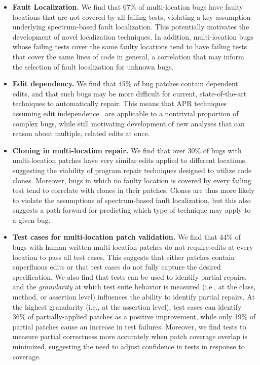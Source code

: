 \documentclass[10pt, conference]{IEEEtran}
\newcommand\bears{\textsc{Bears}\xspace}
\begin{document}
\begin{itemize}
\item \textbf{Fault Localization.}  We find that 67\% of multi-location bugs have faulty 
locations that are not
  covered by all failing tests, violating a key assumption underlying
  spectrum-based fault localization. This potentially 
  motivates the development of novel localization techniques. 
  In addition, multi-location bugs whose failing tests cover the same faulty locations tend to 
  have failing tests that cover the same lines of code in general, a correlation
  that may inform the selection of fault localization for unknown bugs. 
\item \textbf{Edit dependency.} We 
find that 45\% of bug patches contain dependent edits, and that such bugs
may be more difficult for current, state-of-the-art
techniques to automatically repair.  This means that APR techniques assuming edit
independence~\cite{saha2019harnessing, theotherone} are applicable to a nontrivial proportion of complex bugs, while
still motivating development of new analyses that can reason about multiple,
related edits at once. 
\item \textbf{Cloning in multi-location repair.} We find that over 30\% of bugs with multi-location
patches have very similar edits applied to different locations, suggesting the viability of 
program repair techniques designed to utilize code clones. Moreover, bugs in which 
no faulty location is covered by every failing test tend to correlate with
clones in their patches.  
Clones are thus more likely to violate the assumptions of spectrum-based fault 
localization, but this also suggests a path forward for predicting 
which type of technique may apply to a given bug. 
\item \textbf{Test cases for multi-location patch validation.}
  We find that 44\% of bugs with human-written multi-location patches do not
  require edits at every location to pass all test cases. This suggests that
  either patches contain superfluous edits or that test cases do not fully
  capture the desired specification. We also find that tests can be used to
  identify partial repairs, and the \emph{granularity} at which test suite
  behavior is measured (i.e., at the class, method, or assertion level)
  influences the ability to identify partial repairs. At the highest granularity
  (i.e., at the assertion level), test cases can identify 36\% of
  partially-applied patches as a positive improvement, while only 19\% of
  partial patches cause an increase in test failures. Moreover, we find 
  tests to measure partial correctness more accurately when patch coverage 
  overlap is minimized, suggesting the need to adjust confidence in tests
  in response to coverage.
\end{itemize}
\end{document}
